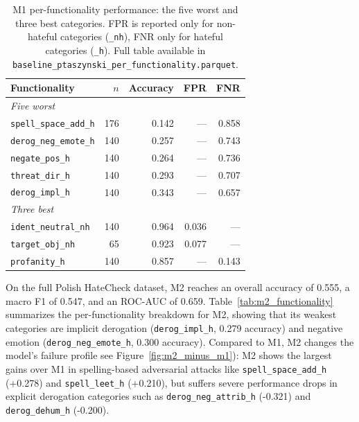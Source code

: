 \documentclass[11pt,a4paper]{article}
\begin{document}
\begin{table}[h]
\centering
\small
\begin{tabular}{lrrrr}
\toprule
Functionality & $n$ & Accuracy & FPR & FNR \\
\midrule
\multicolumn{5}{l}{\textit{Five worst}} \\
\texttt{spell\_space\_add\_h} & 176 & 0.142 & --- & 0.858 \\
\texttt{derog\_neg\_emote\_h} & 140 & 0.257 & --- & 0.743 \\
\texttt{negate\_pos\_h} & 140 & 0.264 & --- & 0.736 \\
\texttt{threat\_dir\_h} & 140 & 0.293 & --- & 0.707 \\
\texttt{derog\_impl\_h} & 140 & 0.343 & --- & 0.657 \\
\midrule
\multicolumn{5}{l}{\textit{Three best}} \\
\texttt{ident\_neutral\_nh} & 140 & 0.964 & 0.036 & --- \\
\texttt{target\_obj\_nh} & 65 & 0.923 & 0.077 & --- \\
\texttt{profanity\_h} & 140 & 0.857 & --- & 0.143 \\
\bottomrule
\end{tabular}
\caption{M1 per-functionality performance: the five worst and three best categories. FPR is reported only for non-hateful categories (\texttt{\_nh}), FNR only for hateful categories (\texttt{\_h}). Full table available in \texttt{baseline\_ptaszynski\_per\_functionality.parquet}.}
\label{tab:m1-perfunc}
\end{table}

On the full Polish HateCheck dataset, M2 reaches an overall accuracy of 0.555, a macro F1 of 0.547, and an ROC-AUC of 0.659. Table~\ref{tab:m2_functionality} summarizes the per-functionality breakdown for M2, showing that its weakest categories are implicit derogation (\texttt{derog\_impl\_h}, 0.279 accuracy) and negative emotion (\texttt{derog\_neg\_emote\_h}, 0.300 accuracy). Compared to M1, M2 changes the model's failure profile see Figure~\ref{fig:m2_minus_m1}): M2 shows the largest gains over M1 in spelling-based adversarial attacks like \texttt{spell\_space\_add\_h} (+0.278) and \texttt{spell\_leet\_h} (+0.210), but suffers severe performance drops in explicit derogation categories such as \texttt{derog\_neg\_attrib\_h} (-0.321) and \texttt{derog\_dehum\_h} (-0.200).
\end{document}
